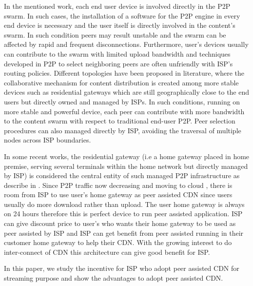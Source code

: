 \documentclass[paper]{ieice}
\begin{document}
In the mentioned work, each end user device is involved directly in the P2P swarm.
In such cases, the installation of a software for the P2P engine in every end device is necessary and the user itself is directly involved in the content's swarm.
In such condition peers may result unstable and the swarm can be affected by rapid and frequent disconnections.
Furthermore, user's devices usually can contribute to the swarm with limited upload bandwidth and techniques developed in P2P to select neighboring peers are often unfriendly with ISP's routing policies.
Different topologies have been proposed in literature, where the collaborative mechanism for content distribution is created among more stable devices such as residential gateways which are still geographically close to the end users but directly owned and managed by ISPs. 
In such conditions, running on more stable and powerful device, each peer can contribute with more bandwidth to the content swarm with respect to traditional end-user P2P. 
Peer selection procedures can also managed directly by ISP, avoiding the traversal of multiple nodes across ISP boundaries.

In some recent works, the residential gateway (i.e a home gateway placed in home premise, serving several terminals within the home network but directly managed by ISP) is considered the central entity of such managed P2P infrastructure as describe in \cite{Misra:2010:IPS:1811099.1811064,Cha:2008:NTP:1855641.1855646}.
Since P2P traffic now decreasing and moving to cloud \cite{Labovitz:2010:IIT:2043164.1851194}, there is room from ISP to use user's home gateway as peer assisted CDN since users usually do more download rather than upload.
The user home gateway is always on 24 hours therefore this is perfect device to run peer assisted application.
ISP can give discount price to user's who wants their home gateway to be used as peer assisted by ISP and ISP can get benefit from peer assisted running in their customer home gateway to help their CDN.
With the growing interest to do inter-connect of CDN \cite{cdni,oceanproject} this architecture can give good benefit for ISP.    

In this paper, we study the incentive for ISP who adopt peer assisted CDN for streaming purpose and show the advantages to adopt peer assisted CDN. 

\end{document}
